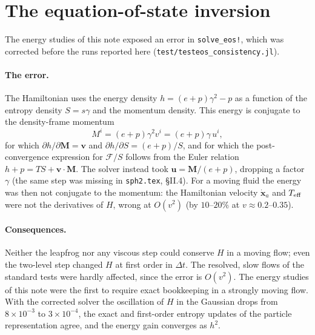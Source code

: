 \documentclass[11pt,aps,preprint,nofootinbib,superscriptaddress,tightenlines]{revtex4-2}
\def\st{\begin{equation}}
\def\stp{\end{equation}}
\let\oldparagraph\paragraph
\renewcommand{\paragraph}{\par\bigskip\oldparagraph}
\begin{document}
\section{The equation-of-state inversion}
\label{app:eos}

The energy studies of this note exposed an error in \texttt{solve\_eos!}, which
was corrected before the runs reported here (\texttt{test/testeos\_consistency.jl}).

\paragraph{The error.}  The Hamiltonian uses the energy density
$h=(e+p)\gamma^2-p$ as a function of the entropy density $S=s\gamma$ and the
momentum density.  This energy is conjugate to the density-frame momentum
\st
M^i=(e+p)\gamma^2v^i=(e+p)\gamma\,u^i ,
\stp
for which $\partial h/\partial\bm M=\bm v$ and $\partial h/\partial S=(e+p)/S$, and
for which the post-convergence expression for $\mathcal F/S$ follows from the
Euler relation $h+p=TS+\bm v\cdot\bm M$.  The solver instead took
$\bm u=\bm M/(e+p)$, dropping a factor $\gamma$ (the same step was missing in
\texttt{sph2.tex}, \S II.4).  For a moving fluid the energy was then not conjugate
to the momentum: the Hamiltonian velocity $\dot{\bm x}_a$ and $T_{\rm eff}$ were not
the derivatives of $H$, wrong at $O(v^2)$ (by $10$--$20\%$ at $v\approx0.2$--$0.35$).

\paragraph{Consequences.}  Neither the leapfrog nor any viscous step could
conserve $H$ in a moving flow; even the two-level step changed $H$ at first order
in $\Delta t$.  The resolved, slow flows of the standard tests were hardly
affected, since the error is $O(v^2)$.  The energy studies of this note were the
first to require exact bookkeeping in a strongly moving flow.  With the corrected
solver the oscillation of $H$ in the Gaussian drops from $8\times10^{-3}$ to
$3\times10^{-4}$, the exact and first-order entropy updates of the particle
representation agree, and the energy gain converges as $h^2$.
\end{document}
